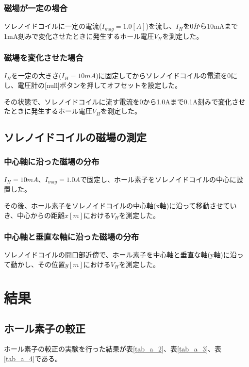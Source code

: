\documentclass[uplatex,11pt]{jsarticle}
\newcommand{\tr}[1]{表\ref{tab_#1}}
\begin{document}
\subsubsection{磁場が一定の場合}

ソレノイドコイルに一定の電流($I_{mag} = 1.0[A]$)を流し、$I_H$を0から10mAまで1mA刻みで変化させたときに発生するホール電圧$V_H$を測定した。

\subsubsection{磁場を変化させた場合}

$I_H$を一定の大きさ($I_H = 10mA$)に固定してからソレノイドコイルの電流を0にし、電圧計の[null]ボタンを押してオフセットを設定した。

その状態で、ソレノイドコイルに流す電流を0から1.0Aまで0.1A刻みで変化させたときに発生するホール電圧$V_H$を測定した。

\subsection{ソレノイドコイルの磁場の測定}

\subsubsection{中心軸に沿った磁場の分布}

$I_H = 10mA$、$I_{mag} = 1.0A$で固定し、ホール素子をソレノイドコイルの中心に設置した。

その後、ホール素子をソレノイドコイルの中心軸(x軸)に沿って移動させていき、中心からの距離$x[m]$における$V_H$を測定した。

\subsubsection{中心軸と垂直な軸に沿った磁場の分布}
ソレノイドコイルの開口部近傍で、ホール素子を中心軸と垂直な軸(y軸)に沿って動かし、その位置$y[m]$における$V_H$を測定した。

\section{結果}

\subsection{ホール素子の較正}

ホール素子の較正の実験を行った結果が\tr{a_2}、\tr{a_3}、\tr{a_4}である。
\end{document}
